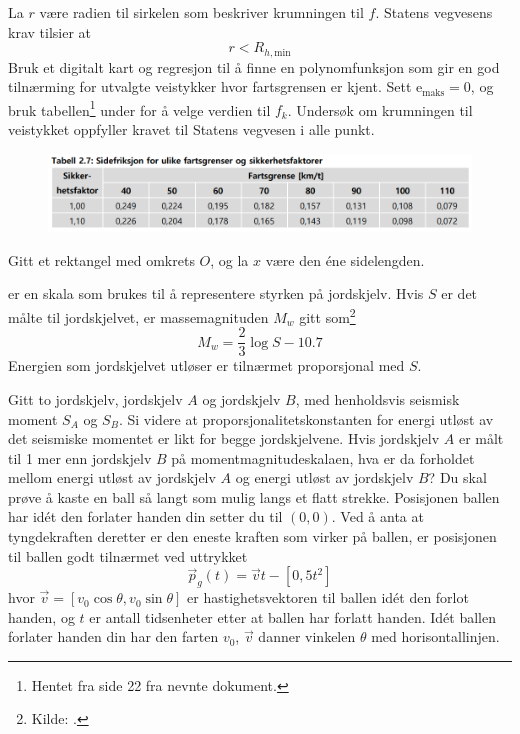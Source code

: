 La $ r $ være radien til sirkelen som beskriver krumningen til $ f $. Statens vegvesens krav tilsier at 
\[ r< R_{h, \text{min}} \]
Bruk et digitalt kart og regresjon til å finne en polynomfunksjon som gir en god tilnærming for utvalgte veistykker hvor fartsgrensen er kjent. Sett $ \textrm{e}_\text{maks}=0 $, og bruk tabellen\footnote{Hentet fra side 22 fra nevnte dokument.} under for å velge verdien til $ f_k $. Undersøk om krumningen til veistykket oppfyller kravet til Statens vegvesen i alle punkt.
\begin{figure}
	\includegraphics[scale=0.32]{fig/tab2_7}
\end{figure}
\newpage
{} 
Gitt et rektangel med omkrets $ O $, og la $ x $ være den éne sidelengden.

 er en skala som brukes til å representere styrken på jordskjelv. Hvis $ S $ er det målte  til jordskjelvet, er massemagnituden $ M_w $ gitt som\footnote{Kilde: .}
\[ M_w=\frac{2}{3} \log S-10.7 \]
Energien som jordskjelvet utløser er tilnærmet proporsjonal med $ S $.\os

Gitt to jordskjelv, jordskjelv $ A $ og jordskjelv $ B $, med henholdsvis seismisk moment $ S_A $ og $ S_B $. Si videre at proporsjonalitetskonstanten for energi utløst av det seismiske momentet er likt for begge jordskjelvene. Hvis jordskjelv $ A $ er målt til 1 mer enn jordskjelv $ B $ på momentmagnitudeskalaen, hva er da forholdet mellom energi utløst av jordskjelv $ A $ og energi utløst av jordskjelv $ B $? 
\newpage
{}
Du skal prøve å kaste en ball så langt som mulig langs et flatt strekke. Posisjonen ballen har idét den forlater handen din setter du til $ (0, 0) $. Ved å anta at tyngdekraften deretter er den eneste kraften som virker på ballen, er posisjonen til ballen godt tilnærmet ved uttrykket
\[ \vec{p}_g(t)=\vec{v}t-[0, 5t^2] \]
hvor $ \vec{v}=[v_0 \cos \theta, v_0 \sin \theta] $ er hastighetsvektoren til ballen idét den forlot handen, og $ t $ er antall tidsenheter etter at ballen har forlatt handen. Idét ballen forlater handen din har den farten $ v_0 $, $ \vec{v} $ danner vinkelen $ \theta $ med horisontallinjen.\vsk 

